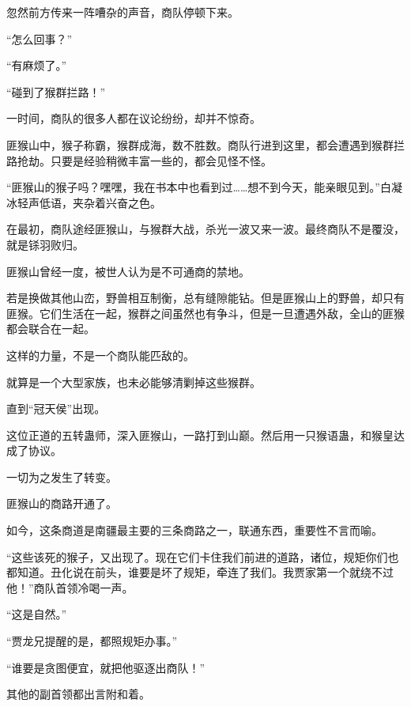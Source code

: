 \begin{this_body}
忽然前方传来一阵嘈杂的声音，商队停顿下来。

“怎么回事？”

“有麻烦了。”

“碰到了猴群拦路！”

一时间，商队的很多人都在议论纷纷，却并不惊奇。

匪猴山中，猴子称霸，猴群成海，数不胜数。商队行进到这里，都会遭遇到猴群拦路抢劫。只要是经验稍微丰富一些的，都会见怪不怪。

“匪猴山的猴子吗？嘿嘿，我在书本中也看到过……想不到今天，能亲眼见到。”白凝冰轻声低语，夹杂着兴奋之色。

在最初，商队途经匪猴山，与猴群大战，杀光一波又来一波。最终商队不是覆没，就是铩羽败归。

匪猴山曾经一度，被世人认为是不可通商的禁地。

若是换做其他山峦，野兽相互制衡，总有缝隙能钻。但是匪猴山上的野兽，却只有匪猴。它们生活在一起，猴群之间虽然也有争斗，但是一旦遭遇外敌，全山的匪猴都会联合在一起。

这样的力量，不是一个商队能匹敌的。

就算是一个大型家族，也未必能够清剿掉这些猴群。

直到“冠天侯”出现。

这位正道的五转蛊师，深入匪猴山，一路打到山巅。然后用一只猴语蛊，和猴皇达成了协议。

一切为之发生了转变。

匪猴山的商路开通了。

如今，这条商道是南疆最主要的三条商路之一，联通东西，重要性不言而喻。

“这些该死的猴子，又出现了。现在它们卡住我们前进的道路，诸位，规矩你们也都知道。丑化说在前头，谁要是坏了规矩，牵连了我们。我贾家第一个就绕不过他！”商队首领冷喝一声。

“这是自然。”

“贾龙兄提醒的是，都照规矩办事。”

“谁要是贪图便宜，就把他驱逐出商队！”

其他的副首领都出言附和着。

\end{this_body}

